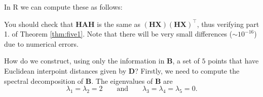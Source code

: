 \documentclass[]{book}
\newenvironment{Shaded}{\begin{snugshade}}{\end{snugshade}}
\newcommand{\CommentTok}[1]{\textcolor[rgb]{0.56,0.35,0.01}{\textit{#1}}}
\newcommand{\DataTypeTok}[1]{\textcolor[rgb]{0.13,0.29,0.53}{#1}}
\newcommand{\DecValTok}[1]{\textcolor[rgb]{0.00,0.00,0.81}{#1}}
\newcommand{\KeywordTok}[1]{\textcolor[rgb]{0.13,0.29,0.53}{\textbf{#1}}}
\newcommand{\NormalTok}[1]{#1}
\newcommand{\OperatorTok}[1]{\textcolor[rgb]{0.81,0.36,0.00}{\textbf{#1}}}
\newcommand{\OtherTok}[1]{\textcolor[rgb]{0.56,0.35,0.01}{#1}}
\newcommand{\StringTok}[1]{\textcolor[rgb]{0.31,0.60,0.02}{#1}}
\theoremstyle{definition}
\theoremstyle{definition}
\theoremstyle{definition}
\theoremstyle{remark}
\begin{document}
In R we can compute these as follows:

\begin{Shaded}
\end{Shaded}

You should check that \(\mathbf H\mathbf A\mathbf H\) is the same as \((\mathbf H\mathbf X)(\mathbf H\mathbf X)^\top\), thus verifying part 1. of Theorem \ref{thm:five1}. Note that there will be very small differences (\(\sim 10^{-16}\)) due to numerical errors.

How do we construct, using only the information in \(\mathbf B\), a set of \(5\) points that have Euclidean interpoint distances given by \(\mathbf D\)?
Firstly, we need to compute the spectral decomposition of \(\mathbf B\). The eigenvalues of \(\mathbf B\) are
\[
\lambda_1=\lambda_2=2 \qquad \text{and} \qquad \lambda_3=\lambda_4=\lambda_5=0.
\]
\end{document}

